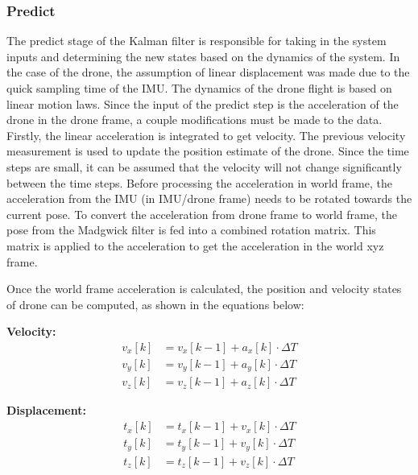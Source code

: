 \documentclass[bare_jrnl_transmag]{subfiles}
\begin{document}
 

\subsubsection{Predict}
The predict stage of the Kalman filter is responsible for taking in the system inputs and determining the new states based on the dynamics of the system. In the case of the drone, the assumption of linear displacement was made due to the quick sampling time of the IMU. The dynamics of the drone flight is based on linear motion laws. Since the input of the predict step is the acceleration of the drone in the drone frame, a couple modifications must be made to the data. Firstly, the linear acceleration is integrated to get velocity. The previous velocity measurement is used to update the position estimate of the drone. Since the time steps are small, it can be assumed that the velocity will not change significantly between the time steps. 
Before processing the acceleration in world frame, the acceleration from the IMU (in IMU/drone frame) needs to be rotated towards the current pose. To convert the acceleration from drone frame to world frame, the pose from the Madgwick filter is fed into a combined rotation matrix. This matrix is applied to the acceleration to get the acceleration in the world xyz frame. \newline

Once the world frame acceleration is calculated, the position and velocity states of drone can be computed, as shown in the equations below:


\noindent\textbf{Velocity:}
\begin{equation*}
\begin{aligned}
v_x[k] &= v_x[k-1] + a_x[k] \cdot \Delta T \\
v_y[k] &= v_y[k-1] + a_y[k] \cdot \Delta T \\
v_z[k] &= v_z[k-1] + a_z[k] \cdot \Delta T
\end{aligned}
\end{equation*}

\noindent\textbf{Displacement:}
\begin{equation*}
\begin{aligned}
t_x[k] &= t_x[k-1] + v_x[k] \cdot \Delta T \\
t_y[k] &= t_y[k-1] + v_y[k] \cdot \Delta T \\
t_z[k] &= t_z[k-1] + v_z[k] \cdot \Delta T
\end{aligned}
\end{equation*}
    
\end{document}
